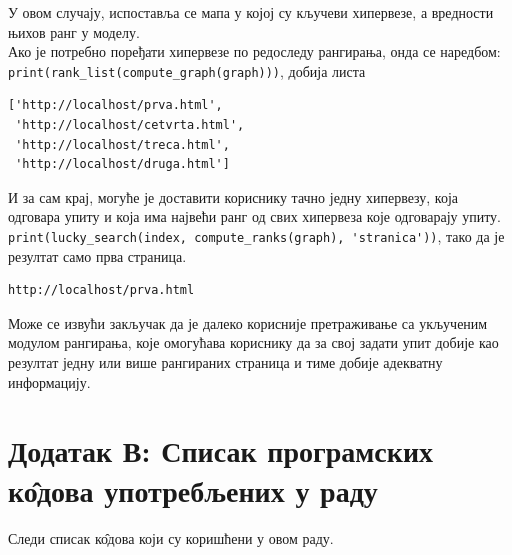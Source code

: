 \documentclass[11pt, serbianc, english, titlepage]{article}
\begin{document}
У овом случају, испоставља се мапа у којој су кључеви хипервезе, а вредности њихов ранг у моделу.\\
Ако је потребно поређати хипервезе по редоследу рангирања, онда се наредбом:\\
\lstinline{print(rank_list(compute_graph(graph)))}, добија листа\\
\begin{lstlisting}
['http://localhost/prva.html',
 'http://localhost/cetvrta.html',
 'http://localhost/treca.html',
 'http://localhost/druga.html']
\end{lstlisting}
И за сам крај, могуће је доставити кориснику тачно једну хипервезу, која одговара упиту и која има највећи ранг од свих хипервеза које одговарају упиту.\\
\lstinline{print(lucky_search(index, compute_ranks(graph), 'stranica'))}, тако да је резултат само прва страница.
\begin{lstlisting}
http://localhost/prva.html
\end{lstlisting}

Може се извући закључак да је далеко корисније претраживање са укљученим модулом рангирања, које омогућава кориснику да за свој задати упит добије као резултат једну или више рангираних страница и тиме добије адекватну информацију. 


		\pagebreak
		\section{Додатак В: Списак програмских к\^{о}дова употребљених у раду}
		Следи списак к\^{о}дова који су коришћени у овом раду.
		\lstlistoflistings
		
		\pagebreak
		
		
	    
\end{document}
